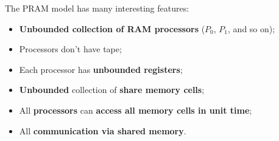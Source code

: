 \noindent
The PRAM model has many interesting features:
\begin{itemize}
    \item \textbf{Unbounded collection of RAM processors} ($P_{0}$, $P_{1}$, and so on);
    \item Processors don't have tape;
    \item Each processor has \textbf{unbounded registers};
    \item \textbf{Unbounded} collection of \textbf{share memory cells};
    \item All \textbf{processors} can \textbf{access all memory cells in unit time};
    \item All \textbf{communication via shared memory}.
\end{itemize}